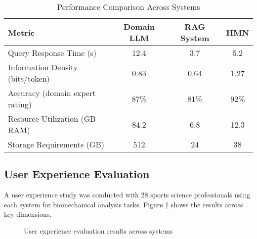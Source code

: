 \documentclass[journal,onecolumn]{IEEEtran}
\begin{document}
\begin{table}[ht]
\centering
\caption{Performance Comparison Across Systems}
\label{tab:performance-comparison}
\begin{tabular}{lccc}
\toprule
\textbf{Metric} & \textbf{Domain LLM} & \textbf{RAG System} & \textbf{HMN} \\
\midrule
Query Response Time (s) & 12.4 & 3.7 & 5.2 \\
Information Density (bits/token) & 0.83 & 0.64 & 1.27 \\
Accuracy (domain expert rating) & 87\% & 81\% & 92\% \\
Resource Utilization (GB-RAM) & 84.2 & 6.8 & 12.3 \\
Storage Requirements (GB) & 512 & 24 & 38 \\
\bottomrule
\end{tabular}
\end{table}

\subsection{User Experience Evaluation}

A user experience study was conducted with 28 sports science professionals using each system for biomechanical analysis tasks. Figure \ref{fig:user-experience} shows the results across key dimensions.

\begin{figure}[ht]
\centering
{}
\caption{User experience evaluation results across systems}
\label{fig:user-experience}
\end{figure}
\end{document}
